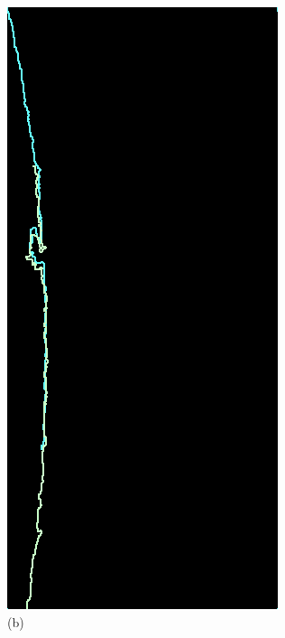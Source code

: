 \begin{figure}[H]
\begin{minipage}{0.24\textwidth}
        \caption*{(b)}
    \end{minipage}\hfill
    \begin{minipage}{0.24\textwidth}
        \centering
        \includegraphics[width=\textwidth]{images/387_match.png} %

\end{minipage}
\end{figure}
